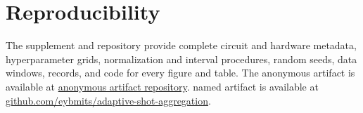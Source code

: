 \appendices
\section{Reproducibility}
The supplement and repository provide complete circuit and hardware metadata,
hyperparameter grids, normalization and interval procedures, random seeds,
data windows, records, and code for every figure and table. The
\ifdefined\ANON
anonymous artifact is available at
\href{https://anonymous.4open.science/r/split-ensemble-qrc-E688/README.md}{anonymous artifact repository}.
\else
named artifact is available at
\href{https://github.com/eybmits/adaptive-shot-aggregation}{github.com/eybmits/adaptive-shot-aggregation}.
\fi
